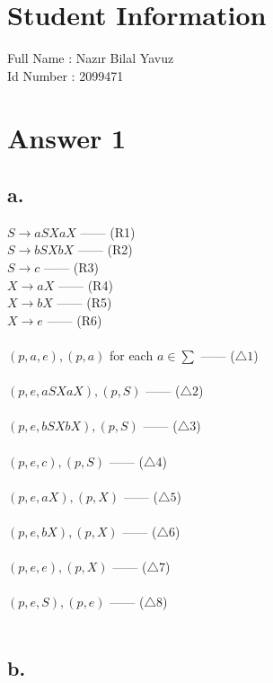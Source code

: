 \documentclass[12pt]{article}
\begin{document}
\section*{Student Information } 
Full Name :  Nazır Bilal Yavuz\\
Id Number :  2099471\\

\section*{Answer 1}

\subsection*{a.}

$S \rightarrow aSXaX$  ------ (R1) \\
$S \rightarrow bSXbX$  ------ (R2) \\
$S \rightarrow c$  ------ (R3) \\ 
$X \rightarrow aX$  ------ (R4) \\
$X \rightarrow bX$  ------ (R5) \\
$X \rightarrow e$  ------ (R6) \\
\\
$(p,a,e),(p,a)$ for each $a \in \sum$  ------ ($\bigtriangleup1$)\\\\
$(p,e,aSXaX),(p,S)$  ------ ($\bigtriangleup2$)\\\\
$(p,e,bSXbX),(p,S)$  ------ ($\bigtriangleup3$)\\\\
$(p,e,c),(p,S)$  ------ ($\bigtriangleup4$)\\\\
$(p,e,aX),(p,X)$  ------ ($\bigtriangleup5$)\\\\
$(p,e,bX),(p,X)$  ------ ($\bigtriangleup6$)\\\\
$(p,e,e),(p,X)$  ------ ($\bigtriangleup7$)\\\\
$(p,e,S),(p,e)$  ------ ($\bigtriangleup8$)\\\\

\subsection*{b.}
\end{document}
